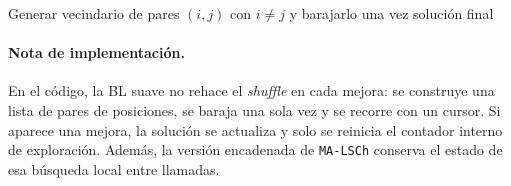 \begin{algorithm}[H]
\SetAlgoLined
{}

Generar vecindario de pares $(i,j)$ con $i\neq j$ y barajarlo una vez\;
\Return solución final\;
\caption{Búsqueda local suave en AM}
\label{alg:bl-suave}
\end{algorithm}

\paragraph{Nota de implementación.} En el código, la BL suave no rehace el \textit{shuffle} en cada mejora: se construye una lista de pares de posiciones, se baraja una sola vez y se recorre con un cursor. Si aparece una mejora, la solución se actualiza y solo se reinicia el contador interno de exploración. Además, la versión encadenada de \texttt{MA-LSCh} conserva el estado de esa búsqueda local entre llamadas.
